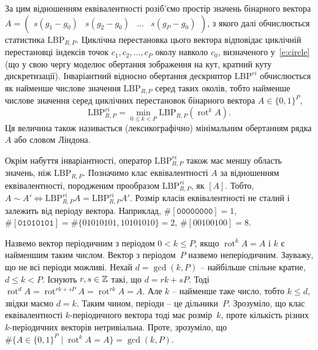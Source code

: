 За цим відношенням еквівалентності розіб'ємо простір значень бінарного вектора $A = \begin{pmatrix}
    s(g_1 - g_0) & s(g_2 - g_0) & \dots  & s(g_P - g_0)
\end{pmatrix}$, з якого далі обчислюється статистика $\mathrm{LBP}_{R,P}$. 
Циклічна перестановка цього вектора відповідає циклічній перестановці індексів точок $c_1, c_2, \dots , c_P$ околу навколо $c_0$, визначеного у~\eqref{e:circle} 
(що у свою чергу моделює обертання зображення на кут, кратний куту дискретизації).
Інваріантний відносно обертання дескриптор $\mathrm{LBP}^{ri}$ обчислюється як найменше числове значення $\mathrm{LBP}_{R,P}$ серед таких околів,
тобто найменше числове значення серед циклічних перестановок бінарного вектора $A \in \{0,1\}^P$,
\begin{equation*}
    \mathrm{LBP}^{ri}_{R,P} = \min_{0\le k < P} \mathrm{LBP}_{R,P} \left( \operatorname{rot}^k A \right).
\end{equation*}
Ця величина також називається (лексикографічно) мінімальним обертанням рядка $A$ або словом Ліндона.   

Окрім набуття інваріантності, оператор $\mathrm{LBP}^{ri}_{R,P}$ також має меншу область значень, ніж $\mathrm{LBP}_{R,P}$.
Позначимо клас еквівалентності $A$ за відношенням еквівалентності, породженим прообразом $\mathrm{LBP}^{ri}_{R,P}$, як $[A]$.
Тобто, $A \sim A' \iff \mathrm{LBP}^{ri}_{R,P} A = \mathrm{LBP}^{ri}_{R,P} A'$.
Розмір класів еквівалентності не сталий і залежить від періоду вектора. 
Наприклад, $\# [\texttt{00000000}] = 1$, $\# [\texttt{01010101}] = \# \{01010101,10101010\} = 2$, $\# [00100100] = 8$.

Назвемо вектор періодичним з періодом $0<k\le P$, якщо $\operatorname{rot}^k A = A$ і $k$ є найменшим таким числом.
Вектор з періодом~$P$ назвемо неперіодичним.
Зауважу, що не всі періоди можливі. Нехай $d=\operatorname{gcd}(k,P)$ -- найбільше спільне кратне, $d\le k < P$. 
Існують $r,s\in \mathbb Z$ такі, що $d=rk+sP$. Тоді $\operatorname{rot}^d A = \operatorname{rot}^{rk+sP} A = \operatorname{rot}^{rk} A = A$.
Але $k$ -- найменше таке число, тобто $k \le d$, звідки маємо $d=k$. Таким чином, періоди -- це дільники~$P$.
Зрозуміло, що клас еквівалентності $k$-періодичного вектора тоді має розмір~$k$, проте кількість різних $k$-періодичних векторів нетривіальна.
Проте, зрозуміло, що $\# \{A\in \{0,1\}^P \mid \operatorname{rot}^k A = A\} = \operatorname{gcd}(k,P)$.  

